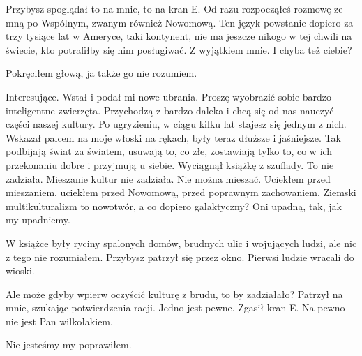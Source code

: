 \ds{} Przybysz spoglądał to na mnie, to na kran E. 
\dm{} Od razu rozpocząłeś rozmowę ze mną po Wspólnym, zwanym również Nowomową. 
Ten język powstanie dopiero za trzy tysiące lat w Ameryce, taki kontynent, nie ma jeszcze nikogo w tej chwili na świecie, kto potrafiłby się nim posługiwać.
Z wyjątkiem mnie. I chyba też ciebie? \de{}

Pokręciłem głową, ja także go nie rozumiem.

\ds{} Interesujące.
\dm{} Wstał i podał mi nowe ubrania.
\dm{} Proszę wyobrazić sobie bardzo inteligentne zwierzęta. 
Przychodzą z bardzo daleka i chcą się od nas nauczyć części naszej kultury.
Po ugryzieniu, w ciągu kilku lat stajesz się jednym z nich. 
\dm{} Wskazał palcem na moje włoski na rękach, były teraz dłuższe i jaśniejsze.
\dm{} Tak podbijają świat za światem, usuwają to, co złe, zostawiają tylko to, co w ich przekonaniu dobre i przyjmują u siebie.
\dm{} Wyciągnął książkę z szuflady.
\dm{} To nie zadziała. Mieszanie kultur nie zadziała. Nie można mieszać.
Uciekłem przed mieszaniem, uciekłem przed Nowomową, przed poprawnym zachowaniem.
Ziemski multikulturalizm to nowotwór, a co dopiero galaktyczny?
Oni upadną, tak, jak my upadniemy.
\de{}

W książce były ryciny spalonych domów, brudnych ulic i wojujących ludzi, ale nic z tego nie rozumiałem.
Przybysz patrzył się przez okno. Pierwsi ludzie wracali do wioski.

\ds{} Ale może gdyby wpierw oczyścić kulturę z brudu, to by zadziałało? \dm{} Patrzył na mnie, szukając potwierdzenia racji.
\dm{} Jedno jest pewne. \dm{} Zgasił kran E. \dm{} Na pewno nie jest Pan wilkołakiem. \de{}

\ds{} Nie jesteśmy my \dm{} poprawiłem. \de{}













